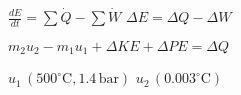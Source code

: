\( \frac{dE}{dt} = \sum \dot{Q} - \sum \dot{W} \)  
\( \Delta E = \Delta Q - \Delta W \)  

\( m_2 u_2 - m_1 u_1 + \Delta KE + \Delta PE = \Delta Q \)  

\( u_1 \, (500^\circ \text{C}, 1.4 \, \text{bar}) \)  
\( u_2 \, (0.003^\circ \text{C}) \)